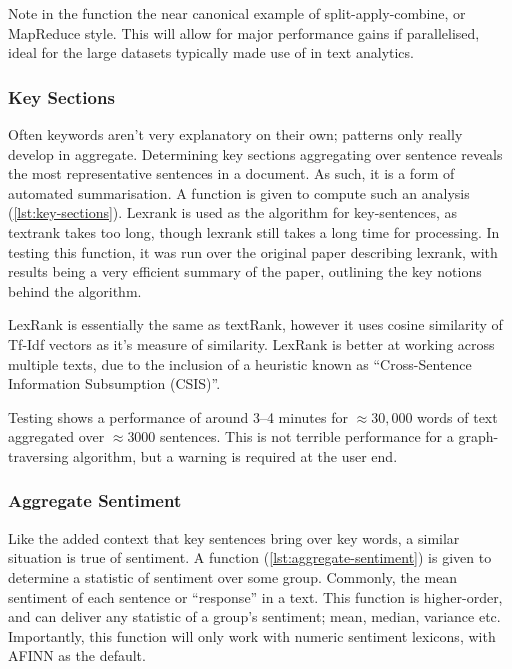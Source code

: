 \message{ !name(jason-cairns-dissertation.tex)}\documentclass[11pt, a4paper, titlepage]{report}
\begin{document}
Note in the function the near canonical example of
split-apply-combine, or MapReduce style. This will allow for major
performance gains if parallelised, ideal for the large datasets
typically made use of in text analytics.

\subsubsection{Key Sections}\label{sec:key-section}

Often keywords aren't very explanatory on their own; patterns only
really develop in aggregate. Determining key sections aggregating over
sentence reveals the most representative sentences in a document. As
such, it is a form of automated summarisation. A function is given to
compute such an analysis (\cref{lst:key-sections}). Lexrank is used as
the algorithm for key-sentences, as textrank takes too long, though
lexrank still takes a long time for processing\autocite{spannbauer19}.
In testing this function, it was run over the original paper
describing lexrank, with results being a very efficient summary of the
paper, outlining the key notions behind the algorithm.

LexRank is essentially the same as textRank, however it uses cosine
similarity of Tf-Idf vectors as it's measure of similarity. LexRank is
better at working across multiple texts, due to the inclusion of a
heuristic known as ``Cross-Sentence Information Subsumption (CSIS)''.

Testing shows a performance of around 3--4 minutes for \(\approx 30,000\)
words of text aggregated over \(\approx 3000\) sentences. This is not
terrible performance for a graph-traversing algorithm, but a warning
is required at the user end.

\subsubsection{Aggregate Sentiment}\label{sec:aggregate-sentiment}

Like the added context that key sentences bring over key words, a
similar situation is true of sentiment. A function
(\cref{lst:aggregate-sentiment}) is given to determine a
statistic of sentiment over some group. Commonly, the mean sentiment
of each sentence or ``response'' in a text. This function is
higher-order, and can deliver any statistic of a group's sentiment;
mean, median, variance etc. Importantly, this function will only work
with numeric sentiment lexicons, with AFINN as the default.
\end{document}

